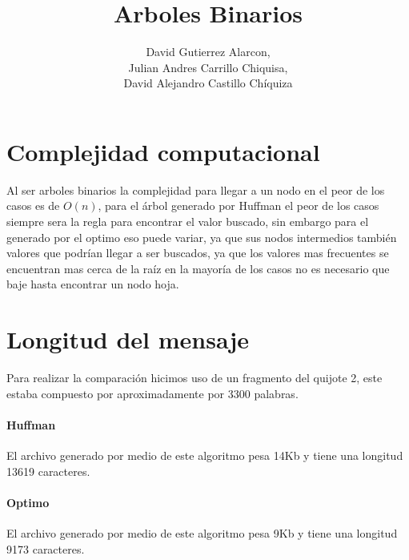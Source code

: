 \documentclass[10pt,letterpaper]{article}
\title{Arboles Binarios}
\author{David Gutierrez Alarcon,\\ Julian Andres Carrillo Chiquisa,\\ David Alejandro Castillo Chíquiza}
\begin{document}
\maketitle

\part*{Complejidad computacional}
	
	Al ser arboles binarios la complejidad para llegar a un nodo en el peor de los casos es de $O(n)$, para el árbol generado por Huffman el peor de los casos siempre sera la regla para encontrar el valor buscado, sin embargo para el generado por el optimo eso puede variar, ya que sus nodos intermedios también valores que podrían llegar a ser buscados, ya que los valores mas frecuentes se encuentran mas cerca de la raíz en la mayoría de los casos no es necesario que baje hasta encontrar un nodo hoja. 

\part*{Longitud del mensaje}
Para realizar la comparación hicimos uso de un fragmento del quijote 2, este estaba compuesto por aproximadamente por 3300 palabras.

	\subsection*{Huffman}

	El archivo generado por medio de este algoritmo pesa 14Kb y tiene una longitud 13619 caracteres.

	\subsection*{Optimo}
	
	El archivo generado por medio de este algoritmo pesa 9Kb y tiene una longitud 9173 caracteres.
	
	
\end{document}
